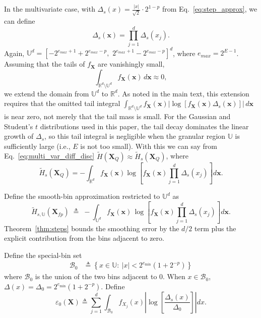 \documentclass[12pt,onecolumn, margin=1in]{IEEEtran}
\newcommand{\bracket}[1]{\left[ #1 \right]}
\begin{document}
In the multivariate case, with $\Delta_s(x) = \frac{|x|}{\sqrt{2}}\cdot 2^{1-p}$ from Eq.~\eqref{eq:step_approx}, we can define
\begin{equation}
    \Delta_s (\mathbf{x}) = \prod^d_{j=1} \Delta_s(x_j).
\end{equation}
Again, $\mathbb{U}^d = [-2^{e_{max} + 1} + 2^{e_{max} - p}, \,\, 2^{e_{max} + 1} - 2^{e_{max} - p}]^d$, where $e_{max} = 2^{E-1}$. Assuming that the tails of $f_\mathbf{X}$ are vanishingly small,
\begin{equation}
    \int_{\mathbb{R}^d \setminus \mathbb{U}^d} f_\mathbf{X}(\mathbf{x}) \, d\mathbf{x} \approx 0,
\end{equation}
we extend the domain from $\mathbb{U}^d$ to $\mathbb{R}^d$. As noted in the main text, this extension requires that the omitted tail integral $\int_{\mathbb{R}^d\setminus\mathbb{U}^d} f_\mathbf{X}(\mathbf{x})|\log[f_\mathbf{X}(\mathbf{x})\Delta_s(\mathbf{x})]|\,d\mathbf{x}$ is near zero, not merely that the tail mass is small. For the Gaussian and Student's $t$ distributions used in this paper, the tail decay dominates the linear growth of $\Delta_s$, so this tail integral is negligible when the granular region $\mathbb{U}$ is sufficiently large (i.e., $E$ is not too small). With this we can say from Eq.~\eqref{eq:multi_var_diff_disc} $\tilde H(\mathbf{X}_Q) \approx \tilde H_s(\mathbf{X}_Q)$, where
\begin{equation}
    \tilde H_s(\mathbf{X}_Q) = -\int_{\mathbb{R}^d}  f_\mathbf{X}(\mathbf{x})
    \log\left[f_\mathbf{X}(\mathbf{x})
    \prod_{j=1}^d \Delta_s(x_j)\right] d\mathbf{x}.
\end{equation}













Define the smooth-bin approximation restricted to $\mathbb U^d$ as
\begin{equation}
\label{eq:Ht_s_U}
\tilde H_{s,\mathbb U}(\mathbf X_{fp})
\;\triangleq\;
-\int_{\mathbb U^d} f_{\mathbf X}(\mathbf x)\,\log\left[f_{\mathbf X}(\mathbf x)\prod_{j=1}^d \Delta_s(x_j)\right]d\mathbf x.
\end{equation}
Theorem~\ref{thm:steps} bounds the smoothing error by the $d/2$ term plus the explicit contribution from the bins adjacent to zero.

Define the special-bin set
\begin{equation}
\label{eq:special_bins}
\begin{aligned}
\mathcal B_0 &\triangleq \left\{x\in \mathbb U:\ |x|<2^{e_{\min}}(1+2^{-p})\right\}
\end{aligned}
\end{equation}
where $\mathcal B_0$ is the union of the two bins adjacent to $0$. When $x \in \mathcal B_{0}$, $\Delta(x) = \Delta_0 = 2^{e_{\min}}(1+2^{-p})$. Define
\begin{equation}
\label{eq:special_error}
\varepsilon_{0}(\mathbf X)
\triangleq
\sum_{j=1}^{d}
\int_{\mathcal B_{0}}
f_{X_j}(x)
\left|
\log\bracket{\frac{\Delta_s(x)}{\Delta_0}}
\right|dx.
\end{equation}
\end{document}
